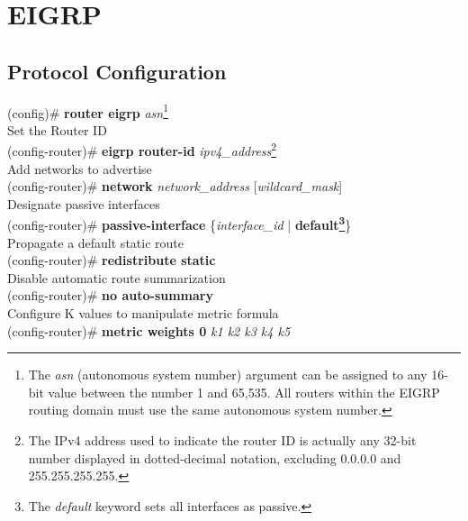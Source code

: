 \section{EIGRP}
\subsection{Protocol Configuration}
(config)\# \textbf{router eigrp} \textit{asn}\footnote{The \textit{asn} (autonomous system number) argument can be assigned to any 16-bit value between the number 1 and 65,535. All routers within the EIGRP routing domain must use the same autonomous system number.}\vspace{11pt}\\
\textrm{Set the Router ID}\\
(config-router)\# \textbf{eigrp router-id} \textit{ipv4\_address}\footnote{The IPv4 address used to indicate the router ID is actually any 32-bit number displayed in dotted-decimal notation, excluding 0.0.0.0 and 255.255.255.255.}\vspace{11pt}\\
\textrm{Add networks to advertise}\\
(config-router)\# \textbf{network} \textit{network\_address} [\textit{wildcard\_mask}]\vspace{11pt}\\
\textrm{Designate passive interfaces}\\
(config-router)\# \textbf{passive-interface} \{\textit{interface\_id} | \textbf{default\footnote{The \textit{default} keyword sets all interfaces as passive.}}\}\vspace{11pt}\\
\textrm{Propagate a default static route}\\
(config-router)\# \textbf{redistribute static}\vspace{11pt}\\
\textrm{Disable automatic route summarization}\\
(config-router)\# \textbf{no auto-summary}\vspace{11pt}\\
\textrm{Configure K values to manipulate metric formula}\\
(config-router)\# \textbf{metric weights 0} \textit{k1 k2 k3 k4 k5}
